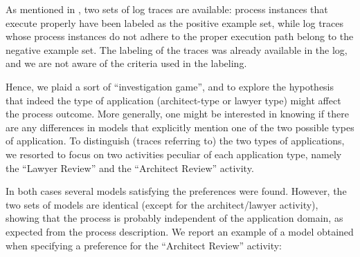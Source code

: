As mentioned in \cite{DBLP:conf/bpm/SlaatsDB21}, two sets of log traces are available: process instances that execute properly have been labeled as the positive example set, while log traces whose process instances do not adhere to the proper execution path belong to the negative example set. The labeling of the traces was already available in the log, and we are not aware of the criteria used in the labeling.

Hence, we plaid a sort of ``investigation game'', and to explore the hypothesis that indeed the type of application (architect-type or lawyer type) might affect the process outcome. More generally, one might be interested in knowing if there are any differences in models that explicitly mention one of the two possible types of application.
To distinguish (traces referring to) the two types of applications, we resorted to focus on two activities peculiar of each application type, namely the “Lawyer Review” and the “Architect Review” activity.

In both cases several models satisfying the preferences were found. However, the two sets of models are identical (except for the architect/lawyer activity), showing that the process is probably independent of the application domain, as expected from the process description.
We report an example of a model obtained when specifying a preference for the “Architect Review” activity:


